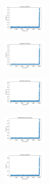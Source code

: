 \vspace*{\fill}
\newpage
\vspace*{\fill}

\begin{figure}[H]    
    \centering
    \begin{subfigure}
        \centering
        \includegraphics[width=0.234\textwidth]{img/HS-LS/iris_set_const_20_949004259_time.png}
    \end{subfigure}
    \hfill
    \begin{subfigure}
        \centering
        \includegraphics[width=0.234\textwidth]{img/HS-LS/ecoli_set_const_20_949004259_time.png}
    \end{subfigure}
    \hfill
    \begin{subfigure}
        \centering
        \includegraphics[width=0.234\textwidth]{img/HS-LS/rand_set_const_20_949004259_time.png}
    \end{subfigure}
    \hfill
    \begin{subfigure}
        \centering
        \includegraphics[width=0.234\textwidth]{img/HS-LS/newthyroid_set_const_20_949004259_time.png}
    \end{subfigure}
    \hfill
    \begin{subfigure}
        \centering
        \includegraphics[width=0.234\textwidth]{img/HS-LS/iris_set_const_20_589741062_time.png}

\end{subfigure}
\end{figure}
